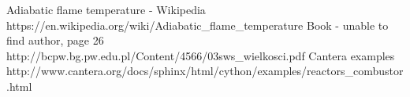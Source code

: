 \documentclass[a4paper, 12pt]{article}
\begin{document}
\begin{thebibliography}{9}
 Adiabatic flame temperature - Wikipedia\\
https://en.wikipedia.org/wiki/Adiabatic\_flame\_temperature
  Book - unable to find author, page 26\\
http://bcpw.bg.pw.edu.pl/Content/4566/03sws\_wielkosci.pdf
 Cantera examples\\http://www.cantera.org/docs/sphinx/html/cython/examples/reactors\_combustor.html
\end{thebibliography}
\end{document}

